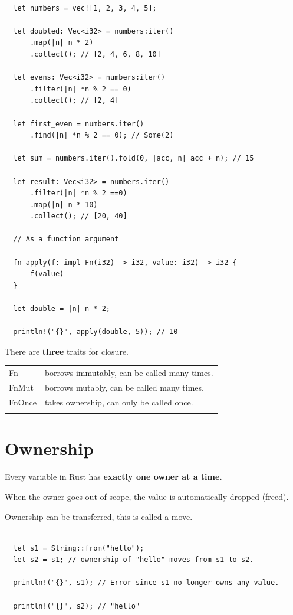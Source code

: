\documentclass[11pt]{article}
\begin{document}
\begin{verbatim}

  let numbers = vec![1, 2, 3, 4, 5];

  let doubled: Vec<i32> = numbers:iter()
      .map(|n| n * 2)
      .collect(); // [2, 4, 6, 8, 10]

  let evens: Vec<i32> = numbers:iter()
      .filter(|n| *n % 2 == 0)
      .collect(); // [2, 4]

  let first_even = numbers.iter()
      .find(|n| *n % 2 == 0); // Some(2)

  let sum = numbers.iter().fold(0, |acc, n| acc + n); // 15

  let result: Vec<i32> = numbers.iter()
      .filter(|n| *n % 2 ==0)
      .map(|n| n * 10)
      .collect(); // [20, 40]

  // As a function argument

  fn apply(f: impl Fn(i32) -> i32, value: i32) -> i32 {
      f(value)
  }

  let double = |n| n * 2;

  println!("{}", apply(double, 5)); // 10

\end{verbatim}

There are \textbf{three} traits for closure.

\begin{center}
\begin{tabular}{ll}
Fn & borrows immutably, can be called many times.\\
FnMut & borrows mutably, can be called many times.\\
FnOnce & takes ownership, can only be called once.\\
 & \\
\end{tabular}
\end{center}
\section{Ownership}
\label{sec:org1e3af42}

Every variable in Rust has \textbf{exactly one owner at a time.}

When the owner goes out of scope, the value is automatically dropped (freed).

Ownership can be transferred, this is called a move.

\begin{verbatim}

  let s1 = String::from("hello");
  let s2 = s1; // ownership of "hello" moves from s1 to s2.

  println!("{}", s1); // Error since s1 no longer owns any value.

  println!("{}", s2); // "hello"


\end{verbatim}
\end{document}
